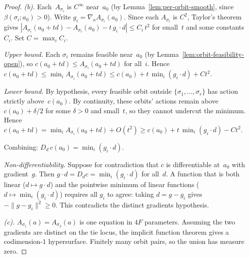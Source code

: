 \begin{unverified}
\begin{proof}
\emph{(b).}
Each~$A_{\sigma_i}$ is $C^\infty$ near~$a_0$
(by Lemma~\ref{lem:per-orbit-smooth},
since $\beta(\sigma_i; a_0) > 0$).
Write $g_i = \nabla_a A_{\sigma_i}(a_0)$.
Since each $A_{\sigma_i}$ is $C^2$, Taylor's theorem gives
$|A_{\sigma_i}(a_0 + td) - A_{\sigma_i}(a_0) - t\, g_i \cdot d|
\leq C_i\, t^2$ for small~$t$ and some constants~$C_i$.
Set $C = \max_i C_i$.

\emph{Upper bound.}
Each $\sigma_i$ remains feasible near~$a_0$
(by Lemma~\ref{lem:orbit-feasibility-open}), so
$c(a_0 + td) \leq A_{\sigma_i}(a_0 + td)$ for all~$i$.
Hence $c(a_0 + td) \leq \min_i A_{\sigma_i}(a_0 + td)
\leq c(a_0) + t\,\min_i(g_i \cdot d) + Ct^2$.

\emph{Lower bound.}
By hypothesis, every feasible orbit outside
$\{\sigma_1, \ldots, \sigma_r\}$ has action strictly
above~$c(a_0)$.
By continuity, these orbits' actions remain
above $c(a_0) + \delta/2$ for some $\delta > 0$
and small~$t$, so they cannot undercut the minimum.
Hence $c(a_0 + td) = \min_i A_{\sigma_i}(a_0 + td) + O(t^2)
\geq c(a_0) + t\,\min_i(g_i \cdot d) - Ct^2$.

Combining: $D_d\, c(a_0) = \min_i (g_i \cdot d)$.

\emph{Non-differentiability.}
Suppose for contradiction that $c$ is differentiable at~$a_0$
with gradient~$g$.
Then $g \cdot d = D_d c = \min_i (g_i \cdot d)$ for all~$d$.
A function that is both linear ($d \mapsto g \cdot d$)
and the pointwise minimum of linear functions
($d \mapsto \min_i(g_i \cdot d)$) requires all $g_i$ to
agree: taking $d = g - g_i$ gives $-\|g - g_i\|^2 \geq 0$.
This contradicts the distinct gradients hypothesis.

\emph{(c).}
$A_{\sigma_1}(a) = A_{\sigma_2}(a)$ is one equation in $4F$ parameters.
Assuming the two gradients are distinct on the tie locus,
the implicit function theorem gives a codimension-$1$
hypersurface. Finitely many orbit pairs, so the union has
measure zero.
\end{proof}
\end{unverified}
